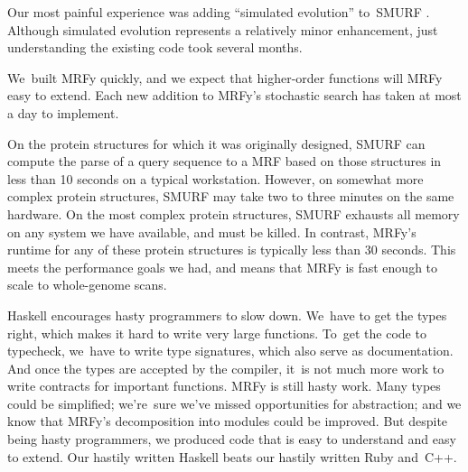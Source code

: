 \documentclass[preprint,nonatbib,blockstyle,nocopyrightspace,times]{sigplanconf}
\let\cite\citep
\begin{document}
Our most painful experience was adding ``simulated evolution''
to~SMURF \cite{Daniels:2012}. 
Although simulated evolution represents a relatively minor
enhancement,
just understanding the existing code took several months.

We~built MRFy quickly, and we expect that
higher-order functions will MRFy easy to extend.
Each new addition to MRFy's stochastic search has taken at most a day
to implement.

%
%

On the protein structures for which it was originally designed, SMURF can 
compute the parse of a query sequence to a MRF based on those structures in 
less than 10 seconds on a typical workstation.
However, on somewhat more 
complex protein structures, SMURF may take two to three minutes on the same 
hardware. 
On the most complex protein structures, SMURF exhausts all memory on 
any system we have available, and must be killed. 
In contrast, MRFy's runtime 
for any of these protein structures is typically less than 30 seconds. 
This 
meets the performance goals we had, and means that MRFy is fast enough to scale 
to whole-genome scans.



Haskell encourages hasty programmers to slow down.
We~have to get the types right,
which makes it hard to write very large functions.
To~get the code to typecheck, we~have to write type signatures, which
also serve as documentation.
And once the types are accepted by the compiler,
it~is not much more work to write contracts for important functions.
MRFy is still hasty work.
Many types could be simplified;
we're~sure we've missed opportunities for abstraction;
and we know that MRFy's decomposition into modules could be improved.
But despite being hasty programmers, we produced code 
that is easy to understand and easy to extend.
Our hastily written Haskell beats
our hastily written Ruby and~C++.
\end{document}
